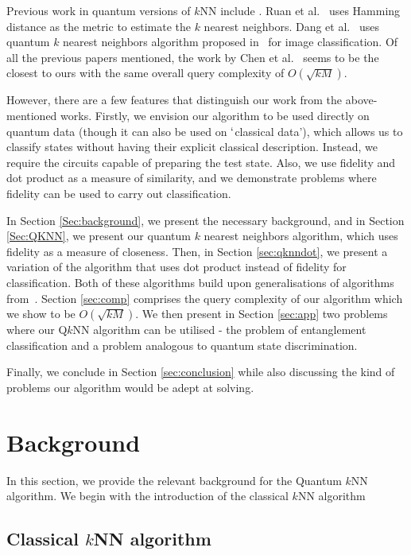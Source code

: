 \documentclass[a4paper,twocolumn,11pt,unpublished]{quantumarticle}
\begin{document}
Previous work in quantum versions of $k$NN include \cite{Wiebe2015, Ruan2017, Chen2015, Dang2018, Schuld2014b}. Ruan et al.~\cite{Ruan2017} uses Hamming distance as the metric to estimate the $k$ nearest neighbors. Dang et al.~\cite{Dang2018} uses quantum $k$ nearest neighbors algorithm proposed in~\cite{Chen2015} for image classification. Of all the previous papers mentioned, the work by Chen et al.~\cite{Chen2015} seems to be the closest to ours with the same overall query complexity of $O(\sqrt{kM})$. 

However, there are a few features that distinguish our work from the above-mentioned works. Firstly, we envision our algorithm to be used directly on quantum data (though it can also be used on $\lq$classical data'), which allows us to classify states without having their explicit classical description. Instead, we require the circuits capable of preparing the test state. Also, we use fidelity and dot product as a measure of similarity, and we demonstrate problems where fidelity can be used to carry out classification. 



In Section \ref{Sec:background}, we present the necessary background, and in Section \ref{Sec:QKNN}, we present our quantum $k$ nearest neighbors algorithm, which uses fidelity as a measure of closeness. Then, in Section \ref{sec:qknndot}, we present a variation of the algorithm that uses dot product instead of fidelity for classification. Both of these algorithms build upon generalisations of algorithms from~\cite{Mitarai2019}. Section \ref{sec:comp} comprises the query complexity of our algorithm which we show to be $O(\sqrt{kM})$. 
    We then present in Section \ref{sec:app} two problems where our  Q$k$NN algorithm can be utilised - the problem of entanglement classification and a problem analogous to quantum state discrimination. 
      
    Finally, we conclude in Section \ref{sec:conclusion} while also discussing the kind of problems our algorithm would be adept at solving.
    
\section{Background}\label{Sec:Background}
    \label{Sec:background}
    In this section, we provide the relevant background for the Quantum $k$NN algorithm. We begin with the introduction of the classical $k$NN algorithm
    \subsection{Classical $k$NN algorithm}
    
\end{document}
